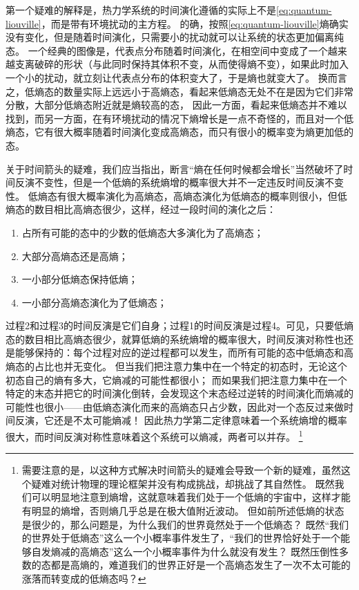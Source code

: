 \documentclass[hyperref, UTF8, a4paper]{ctexart}
\begin{document}
第一个疑难的解释是，热力学系统的时间演化遵循的实际上不是\eqref{eq:quantum-liouville}，而是带有环境扰动的主方程。
的确，按照\eqref{eq:quantum-liouville}熵确实没有变化，但是随着时间演化，只需要小的扰动就可以让系统的状态更加偏离纯态。
一个经典的图像是，代表点分布随着时间演化，在相空间中变成了一个越来越支离破碎的形状（与此同时保持其体积不变，从而使得熵不变），如果此时加入一个小的扰动，就立刻让代表点分布的体积变大了，于是熵也就变大了。
换而言之，低熵态的数量实际上远远小于高熵态，看起来低熵态无处不在是因为它们非常分散，大部分低熵态附近就是熵较高的态，
因此一方面，看起来低熵态并不难以找到，而另一方面，在有环境扰动的情况下熵增长是一点不奇怪的，而且对一个低熵态，它有很大概率随着时间演化变成高熵态，而只有很小的概率变为熵更加低的态。

关于时间箭头的疑难，我们应当指出，断言“熵在任何时候都会增长”当然破坏了时间反演不变性，但是一个低熵的系统熵增的概率很大并不一定违反时间反演不变性。
低熵态有很大概率演化为高熵态，高熵态演化为低熵态的概率则很小，但低熵态的数目相比高熵态很少，这样，经过一段时间的演化之后：
\begin{enumerate}
    \item 占所有可能的态中的少数的低熵态大多演化为了高熵态；
    \item 大部分高熵态还是高熵；
    \item 一小部分低熵态保持低熵；
    \item 一小部分高熵态演化为了低熵态；
\end{enumerate}
过程2和过程3的时间反演是它们自身；过程1的时间反演是过程4。可见，只要低熵态的数目相比高熵态很少，就算低熵的系统熵增的概率很大，时间反演对称性也还是能够保持的：每个过程对应的逆过程都可以发生，而所有可能的态中低熵态和高熵态的占比也并无变化。
但当我们把注意力集中在一个特定的初态时，无论这个初态自己的熵有多大，它熵减的可能性都很小；
而如果我们把注意力集中在一个特定的末态并把它的时间演化倒转，会发现这个末态经过逆转的时间演化而熵减的可能性也很小——由低熵态演化而来的高熵态只占少数，因此对一个态反过来做时间反演，它还是不太可能熵减！
因此热力学第二定律意味着一个系统熵增的概率很大，而时间反演对称性意味着这个系统可以熵减，两者可以并存。%
\footnote{需要注意的是，以这种方式解决时间箭头的疑难会导致一个新的疑难，虽然这个疑难对统计物理的理论框架并没有构成挑战，却挑战了其自然性。
既然我们可以明显地注意到熵增，这就意味着我们处于一个低熵的宇宙中，这样才能有明显的熵增，否则熵几乎总是在极大值附近波动。
但如前所述低熵的状态是很少的，那么问题是，为什么我们的世界竟然处于一个低熵态？
既然“我们的世界处于低熵态”这么一个小概率事件发生了，“我们的世界恰好处于一个能够自发熵减的高熵态”这么一个小概率事件为什么就没有发生？
既然压倒性多数的态都是高熵的，难道我们的世界正好是一个高熵态发生了一次不太可能的涨落而转变成的低熵态吗？}%
\end{document}
